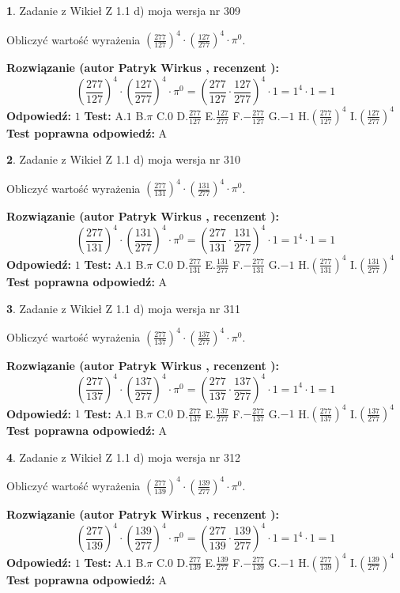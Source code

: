 \documentclass[12pt, a4paper]{article}
\theoremstyle{definition} %
\newtheorem{zad}{}
\newcommand{\zadStart}[1]{\begin{zad}#1\newline}
\newcommand{\zadStop}{\end{zad}}
\newcommand{\rozwStart}[2]{\noindent \textbf{Rozwiązanie (autor #1 , recenzent #2): }\newline}
\newcommand{\rozwStop}{\newline}
\newcommand{\odpStart}{\noindent \textbf{Odpowiedź:}\newline}
\newcommand{\odpStop}{\newline}
\newcommand{\testStart}{\noindent \textbf{Test:}\newline}
\newcommand{\testStop}{\newline}
\newcommand{\kluczStart}{\noindent \textbf{Test poprawna odpowiedź:}\newline}
\newcommand{\kluczStop}{\newline}
\begin{document}
\zadStart{Zadanie z Wikieł Z 1.1 d) moja wersja nr 309}

Obliczyć wartość wyrażenia $(\frac{277}{127})^{4} \cdot (\frac{127}{277})^{4} \cdot \pi^{0}$.
\zadStop
\rozwStart{Patryk Wirkus}{}
$$(\frac{277}{127})^{4} \cdot (\frac{127}{277})^{4} \cdot \pi^{0} = (\frac{277}{127} \cdot \frac{127}{277})^{4} \cdot 1 = 1^{4} \cdot 1 = 1$$
\rozwStop
\odpStart
$1$
\odpStop
\testStart
A.$1$ B.$\pi$ C.$0$ D.$\frac{277}{127}$ E.$\frac{127}{277}$
F.$-\frac{277}{127}$ G.$-1$
H.$(\frac{277}{127})^{4}$
I.$(\frac{127}{277})^{4}$
\testStop
\kluczStart
A
\kluczStop



\zadStart{Zadanie z Wikieł Z 1.1 d) moja wersja nr 310}

Obliczyć wartość wyrażenia $(\frac{277}{131})^{4} \cdot (\frac{131}{277})^{4} \cdot \pi^{0}$.
\zadStop
\rozwStart{Patryk Wirkus}{}
$$(\frac{277}{131})^{4} \cdot (\frac{131}{277})^{4} \cdot \pi^{0} = (\frac{277}{131} \cdot \frac{131}{277})^{4} \cdot 1 = 1^{4} \cdot 1 = 1$$
\rozwStop
\odpStart
$1$
\odpStop
\testStart
A.$1$ B.$\pi$ C.$0$ D.$\frac{277}{131}$ E.$\frac{131}{277}$
F.$-\frac{277}{131}$ G.$-1$
H.$(\frac{277}{131})^{4}$
I.$(\frac{131}{277})^{4}$
\testStop
\kluczStart
A
\kluczStop



\zadStart{Zadanie z Wikieł Z 1.1 d) moja wersja nr 311}

Obliczyć wartość wyrażenia $(\frac{277}{137})^{4} \cdot (\frac{137}{277})^{4} \cdot \pi^{0}$.
\zadStop
\rozwStart{Patryk Wirkus}{}
$$(\frac{277}{137})^{4} \cdot (\frac{137}{277})^{4} \cdot \pi^{0} = (\frac{277}{137} \cdot \frac{137}{277})^{4} \cdot 1 = 1^{4} \cdot 1 = 1$$
\rozwStop
\odpStart
$1$
\odpStop
\testStart
A.$1$ B.$\pi$ C.$0$ D.$\frac{277}{137}$ E.$\frac{137}{277}$
F.$-\frac{277}{137}$ G.$-1$
H.$(\frac{277}{137})^{4}$
I.$(\frac{137}{277})^{4}$
\testStop
\kluczStart
A
\kluczStop



\zadStart{Zadanie z Wikieł Z 1.1 d) moja wersja nr 312}

Obliczyć wartość wyrażenia $(\frac{277}{139})^{4} \cdot (\frac{139}{277})^{4} \cdot \pi^{0}$.
\zadStop
\rozwStart{Patryk Wirkus}{}
$$(\frac{277}{139})^{4} \cdot (\frac{139}{277})^{4} \cdot \pi^{0} = (\frac{277}{139} \cdot \frac{139}{277})^{4} \cdot 1 = 1^{4} \cdot 1 = 1$$
\rozwStop
\odpStart
$1$
\odpStop
\testStart
A.$1$ B.$\pi$ C.$0$ D.$\frac{277}{139}$ E.$\frac{139}{277}$
F.$-\frac{277}{139}$ G.$-1$
H.$(\frac{277}{139})^{4}$
I.$(\frac{139}{277})^{4}$
\testStop
\kluczStart
A
\kluczStop
\end{document}
